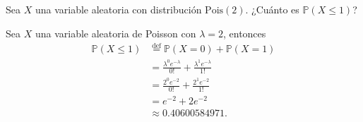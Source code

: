 \question

	Sea $X$ una variable aleatoria con distribución $\mathrm{Pois}(2)$. ¿Cuánto es $\mathds{P}\left(X\le1\right)$?

	\begin{solutionordottedlines}
		Sea $X$ una variable aleatoria de Poisson con $\lambda=2$, entonces
		\begin{align*}
			\mathds{P}\left(X\le1\right)
			&\stackrel{\text{def}}{=}\mathds{P}\left(X=0\right)+\mathds{P}\left(X=1\right)\\
			&=\frac{\lambda^{0}e^{-\lambda}}{0!}+\frac{\lambda^{1}e^{-\lambda}}{1!}\\
			&=\frac{2^{0}e^{-2}}{0!}+\frac{2^{1}e^{-2}}{1!}\\
			&=e^{-2}+2e^{-2}\\
			&\approx\num{0.40600584971}.
		\end{align*}
	\end{solutionordottedlines}